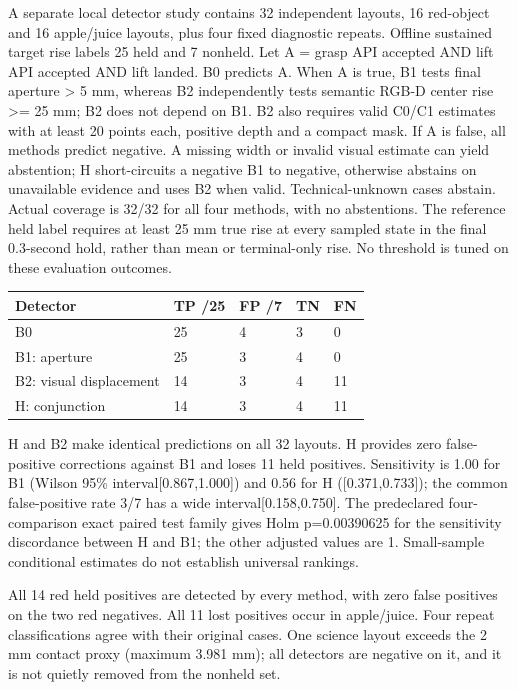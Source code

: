 \documentclass[10pt]{article}
\begin{document}
A separate local detector study contains 32 independent layouts, 16 red-object and 16 apple/juice layouts, plus four fixed diagnostic repeats. Offline sustained target rise labels 25 held and 7 nonheld. Let A = grasp API accepted AND lift API accepted AND lift landed. B0 predicts A. When A is true, B1 tests final aperture > 5 mm, whereas B2 independently tests semantic RGB-D center rise >= 25 mm; B2 does not depend on B1. B2 also requires valid C0/C1 estimates with at least 20 points each, positive depth and a compact mask. If A is false, all methods predict negative. A missing width or invalid visual estimate can yield abstention; H short-circuits a negative B1 to negative, otherwise abstains on unavailable evidence and uses B2 when valid. Technical-unknown cases abstain. Actual coverage is 32/32 for all four methods, with no abstentions. The reference held label requires at least 25 mm true rise at every sampled state in the final 0.3-second hold, rather than mean or terminal-only rise. No threshold is tuned on these evaluation outcomes.

\par\noindent\begin{minipage}{\linewidth}\centering\small\setlength{\tabcolsep}{4pt}\begin{tabular}{p{}p{}p{}p{}p{}}\hline
Detector & TP /25 & FP /7 & TN & FN \\ \hline
B0 & 25 & 4 & 3 & 0 \\
B1: aperture & 25 & 3 & 4 & 0 \\
B2: visual displacement & 14 & 3 & 4 & 11 \\
H: conjunction & 14 & 3 & 4 & 11 \\
\hline\end{tabular}\end{minipage}\par\medskip

H and B2 make identical predictions on all 32 layouts. H provides zero false-positive corrections against B1 and loses 11 held positives. Sensitivity is 1.00 for B1 (Wilson 95\% interval[0.867,1.000]) and 0.56 for H ([0.371,0.733]); the common false-positive rate 3/7 has a wide interval[0.158,0.750]. The predeclared four-comparison exact paired test family gives Holm p=0.00390625 for the sensitivity discordance between H and B1; the other adjusted values are 1. Small-sample conditional estimates do not establish universal rankings.

All 14 red held positives are detected by every method, with zero false positives on the two red negatives. All 11 lost positives occur in apple/juice. Four repeat classifications agree with their original cases. One science layout exceeds the 2 mm contact proxy (maximum 3.981 mm); all detectors are negative on it, and it is not quietly removed from the nonheld set.
\end{document}
